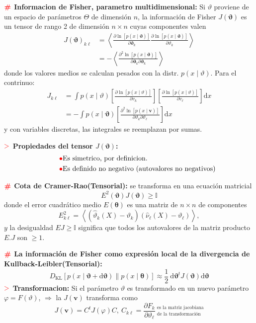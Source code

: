 \documentclass[%
 reprint,
 amsmath,amssymb,
 aps,
]{revtex4-1}
\begin{document}
\textbf{$\color{red}{\textbf{\#}}$ Informacion de Fisher, parametro multidimensional:}
Si $\vartheta$ proviene de un espacio de parámetros $\Theta$ de dimensión $n$, la información de
Fisher $J(\boldsymbol{\vartheta})$ es un tensor de rango 2 de dimensión $n \times n$ cuyas componentes valen
$$
\begin{aligned}
J(\boldsymbol{\vartheta})_{k \ell} &=\left\langle\frac{\partial \ln [p(x \mid \boldsymbol{\vartheta})]}{\partial \boldsymbol{\vartheta}_{k}} \frac{\partial \ln [p(x \mid \boldsymbol{\vartheta})]}{\partial \vartheta_{k}}\right\rangle \\
&=-\left\langle\frac{\partial^{2} \ln [p(x \mid \boldsymbol{\vartheta})]}{\partial \boldsymbol{\vartheta}_{k} \partial \boldsymbol{\vartheta}_{k}}\right\rangle
\end{aligned}
$$
donde los valores medios se calculan pesados con la distr. $p(x \mid \vartheta)$. Para el contrinuo:
$$
\begin{aligned}
J_{k \ell} &=\int p(x \mid \vartheta)\left[\frac{\partial \ln [p(x \mid \vartheta)]}{\partial v_{k}}\right]\left[\frac{\partial \ln [p(x \mid \vartheta)]}{\partial v_{\ell}}\right] \mathrm{d} x \\
&=-\int p(x \mid \boldsymbol{\vartheta})\left[\frac{\partial^{2} \ln [p(x \mid \boldsymbol{v})]}{\partial \vartheta_{k} \partial \vartheta_{\ell}}\right] \mathrm{d} x
\end{aligned}
$$
y con variables discretas, las integrales se reemplazan por sumas. 

\textbf{$\textcolor{red}{\mathbf{>}}$ Propiedades del tensor $J(\mathbf{\vartheta})$:}
$$
\begin{aligned}  
   &\qquad\ {\color{red}{\bullet}} \text{Es simetrico, por definicion.} \\
   &\qquad\ {\color{red}{\bullet}} \text{Es definido no negativo (autovalores no negativos)}
\end{aligned}
$$

\textbf{$\color{red}{\textbf{\#}}$ Cota de Cramer-Rao(Tensorial):} 
se transforma en una ecuación matricial
$$
E^{2}(\boldsymbol{\vartheta}) J(\boldsymbol{\vartheta}) \geq \mathbb{I}
$$
donde el error cuadrático medio $E(\boldsymbol{\theta})$ es una matriz de $n \times n$ de componentes
$$
E_{k \ell}^{2}=\left\langle 
\left(
  \hat{\vartheta}_{k}(X)-\vartheta_{k}
  \right)
\left(
  \hat{\nu}_{\ell}(X)-\vartheta_{\ell}
  \right)
  \right\rangle,
$$
$y$ la desigualdad $E J \geq \mathbb{I}$ significa que todos los autovalores de la matriz producto $E . J$ son $\geq 1$.

\textbf{$\color{red}{\textbf{\#}}$ La información de Fisher como expresión local de la divergencia de Kullback-Leibler(Tensorial):}
$$
D_{\mathrm{KL}}[p(x \mid \boldsymbol{\vartheta}+\mathrm{d} \boldsymbol{\vartheta}) \| p(x \mid \boldsymbol{\theta})] \approx \frac{1}{2} \mathrm{~d} \boldsymbol{\vartheta}^{t} J(\boldsymbol{\vartheta}) \mathrm{d} \boldsymbol{\vartheta}
$$
\textbf{$\textcolor{red}{\mathbf{>}}$ Transformacion:} 
Si el parámetro $\vartheta$ es transformado en un nuevo parámetro $\varphi=F(\vartheta)$, $\Rightarrow$ la $J(\boldsymbol{v})$ transforma como
$$
J(\boldsymbol{v})=C^{t} J(\varphi) C
, \
C_{k \ell}=\frac{\partial F_{k}}{\partial \vartheta_{\ell}} \
^\text{es la matriz jacobiana}
_\text{de la transformación}
$$
\end{document}
